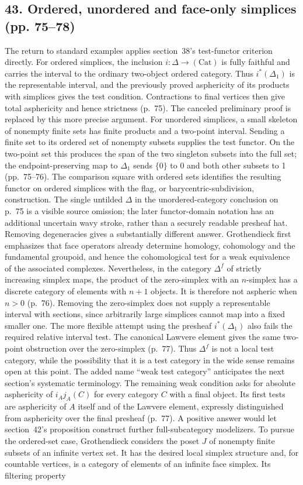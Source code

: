 \documentclass[10pt,oneside]{book}
\begin{document}
\subsection*{43. Ordered, unordered and face-only simplices (pp. 75--78)}
The return to standard examples applies section~38's test-functor criterion directly. For ordered simplices, the inclusion $i:\Delta\to(\mathrm{Cat})$ is fully faithful and carries the interval to the ordinary two-object ordered category. Thus $i^*(\Delta_1)$ is the representable interval, and the previously proved asphericity of its products with simplices gives the test condition. Contractions to final vertices then give total asphericity and hence strictness (p.~75). The canceled preliminary proof is replaced by this more precise argument. For unordered simplices, a small skeleton of nonempty finite sets has finite products and a two-point interval. Sending a finite set to its ordered set of nonempty subsets supplies the test functor. On the two-point set this produces the span of the two singleton subsets into the full set; the endpoint-preserving map to $\Delta_1$ sends $\{0\}$ to 0 and both other subsets to 1 (pp.~75--76). The comparison square with ordered sets identifies the resulting functor on ordered simplices with the flag, or barycentric-subdivision, construction. The single untilded $\Delta$ in the unordered-category conclusion on p.~75 is a visible source omission; the later functor-domain notation has an additional uncertain wavy stroke, rather than a securely readable presheaf hat. Removing degeneracies gives a substantially different answer. Grothendieck first emphasizes that face operators already determine homology, cohomology and the fundamental groupoid, and hence the cohomological test for a weak equivalence of the associated complexes. Nevertheless, in the category $\Delta^f$ of strictly increasing simplex maps, the product of the zero-simplex with an $n$-simplex has a discrete category of elements with $n+1$ objects. It is therefore not aspheric when $n>0$ (p.~76). Removing the zero-simplex does not supply a representable interval with sections, since arbitrarily large simplices cannot map into a fixed smaller one. The more flexible attempt using the presheaf $i^*(\Delta_1)$ also fails the required relative interval test. The canonical Lawvere element gives the same two-point obstruction over the zero-simplex (p.~77). Thus $\Delta^f$ is not a local test category, while the possibility that it is a test category in the wide sense remains open at this point. The added name ``weak test category'' anticipates the next section's systematic terminology. The remaining weak condition asks for absolute asphericity of $i_Aj_A(C)$ for every category $C$ with a final object. Its first tests are asphericity of $A$ itself and of the Lawvere element, expressly distinguished from asphericity over the final presheaf (p.~77). A positive answer would let section~42's proposition construct further full-subcategory modelizers. To pursue the ordered-set case, Grothendieck considers the poset $J$ of nonempty finite subsets of an infinite vertex set. It has the desired local simplex structure and, for countable vertices, is a category of elements of an infinite face simplex. Its filtering property 
\end{document}
